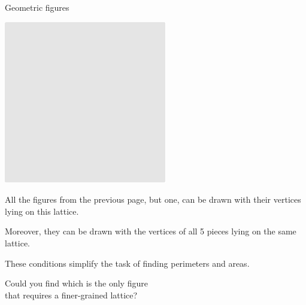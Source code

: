 \documentclass[14pt]{beamer}
\begin{document}

    \begin{frame}{Geometric figures}
        \begin{center}
            \begin{minipage}{0.5\textwidth}%
                \centering \includegraphics[scale=0.70]{figures/figure022a.pdf}
            \end{minipage}\hfill\begin{minipage}{0.49\textwidth} \small
                All the figures from the previous page, but one, can be drawn with their vertices lying on this lattice.

                \bigskip

                Moreover, they can be drawn with the vertices of all 5 pieces lying on the same lattice.

                \bigskip

                These conditions simplify the task of finding perimeters and areas.
            \end{minipage}

            \bigskip \bigskip

            Could you find which is the only figure\\that requires a finer-grained lattice?
        \end{center}

    \end{frame}

\end{document}
